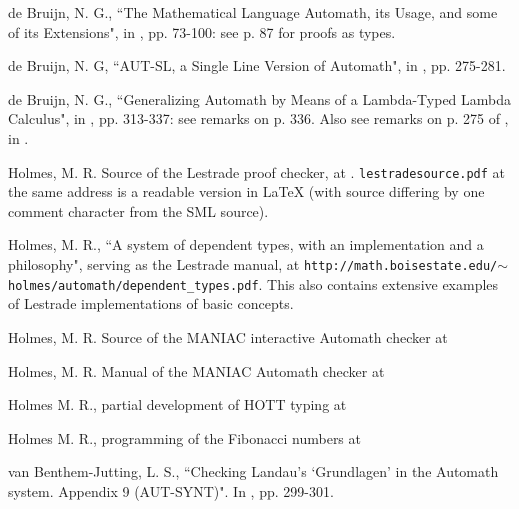 \documentclass[submission,copyright,creativecommons]{eptcs}
\begin{document}
\begin{thebibliography}{99}

 de Bruijn, N. G., ``The Mathematical Language Automath, its Usage, and some of its Extensions", in \cite{yellowbook}, pp. 73-100:  see p. 87 for proofs as types.

   de Bruijn, N. G, ``AUT-SL, a Single Line Version of Automath", in \cite{yellowbook}, pp. 275-281.

  de Bruijn, N. G., ``Generalizing Automath by Means of a Lambda-Typed Lambda Calculus", in \cite{yellowbook}, pp. 313-337:  see remarks on p. 336.  Also see remarks on p. 275 of \cite{yellowbook}, in \cite{autsl}.

 

  Holmes, M. R.  Source of the Lestrade proof checker, at .  {\tt lestradesource.pdf}
at the same address is a readable version in LaTeX (with source differing by one comment character from the SML source).

 Holmes, M. R., ``A system of dependent types, with an implementation and a philosophy", serving as the Lestrade manual, at
{\tt  http://math.boisestate.edu/$\sim$holmes/automath/dependent\_types.pdf}.  This also contains extensive examples of Lestrade implementations of basic concepts.

  Holmes, M. R.  Source of the MANIAC interactive Automath checker at 

  Holmes, M. R.  Manual of the MANIAC Automath checker at 

 Holmes M. R., partial development of HOTT typing at  

  Holmes M. R., programming of the Fibonacci numbers at 

  van Benthem-Jutting, L. S., ``Checking Landau's `Grundlagen' in the Automath system.  Appendix 9 (AUT-SYNT)".  In \cite{yellowbook}, pp. 299-301.


\end{thebibliography}
\end{document}
